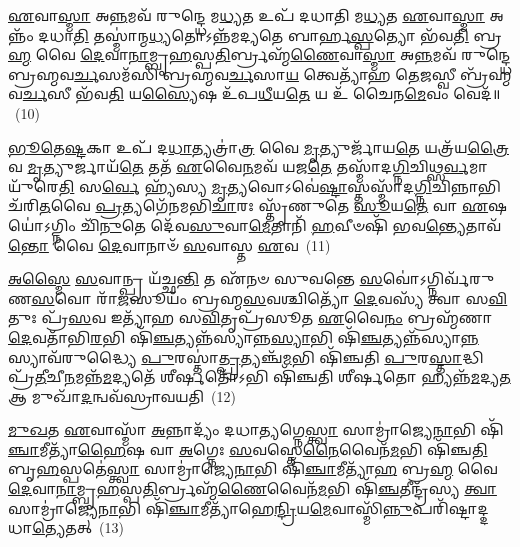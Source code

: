 \-\ul{𑌏}\-𑌵𑌾\-\ul{𑌸𑍍𑌮𑌾} 𑌅\-\ul{𑌨𑍍𑌨}\-𑌮𑌵᳴ 𑌰𑍁𑌨𑍍𑌦𑍍𑌧𑍇 𑌮\-\ul{𑌧𑍍𑌯}\-𑌤 𑌉𑌪᳴ 𑌦𑌧𑌾𑌤𑌿 𑌮\-\ul{𑌧𑍍𑌯}\-𑌤 \ul{𑌏}\-𑌵𑌾\-\ul{𑌸𑍍𑌮𑌾} 𑌅𑌨𑍍𑌨𑌂᳴ 𑌦𑌧𑌾\-\ul{𑌤𑌿} 𑌤𑌸𑍍𑌮𑌾॑𑌨𑍍𑌮\-\ul{𑌧𑍍𑌯}\-𑌤𑍋\-𑌽𑌨𑍍𑌨᳴𑌮𑌦𑍍𑌯𑌤𑍇 𑌬𑌾𑌰𑍍\mbox{}𑌹\-\ul{𑌸𑍍𑌪}\-𑌤𑍍𑌯𑍋 𑌭᳴𑌵\-\ul{𑌤𑌿} 𑌬𑍍𑌰\-\ul{𑌹𑍍𑌮} 𑌵𑍈 \ul{𑌦𑍇}\-𑌵𑌾\-\ul{𑌨𑌾}\-𑌮𑍍𑌬𑍃\-\ul{𑌹}\-𑌸𑍍𑌪\-\ul{𑌤𑌿}\-𑌰𑍍𑌬𑍍𑌰𑌹𑍍𑌮᳴\-\ul{𑌣𑍈}\-𑌵𑌾\-\ul{𑌸𑍍𑌮𑌾} 𑌅\-\ul{𑌨𑍍𑌨}\-𑌮𑌵᳴ 𑌰𑍁𑌨𑍍𑌦𑍍𑌧𑍇 𑌬𑍍𑌰𑌹𑍍𑌮𑌵\-\ul{𑌰𑍍𑌚}\-𑌸𑌮᳴𑌸𑌿 𑌬𑍍𑌰𑌹𑍍𑌮𑌵\-\ul{𑌰𑍍𑌚}\-𑌸𑌾\-\ul{𑌯} 𑌤𑍍𑌵𑍇𑌤𑍍𑌯𑌾᳴𑌹 𑌤𑍇\-\ul{𑌜}\-𑌸𑍍𑌵𑍀 𑌬𑍍𑌰᳴𑌹𑍍𑌮𑌵\-\ul{𑌰𑍍𑌚}\-𑌸𑍀 𑌭᳴𑌵\-\ul{𑌤𑌿} 𑌯\-\ul{𑌸𑍍𑌯𑍈}\-𑌷 𑌉᳴𑌪\-\ul{𑌧𑍀}\-𑌯\-\ul{𑌤𑍇} 𑌯 𑌉᳴ 𑌚𑍈𑌨\-\ul{𑌮𑍇}\-𑌵𑌂 𑌵𑍇𑌦᳴॥~(10)

{\anuvakamend[{\-\ul{𑌅}\-𑌮𑍃𑌤᳴𑌮𑌸𑍍𑌮𑍈 𑌜𑌾𑌯\-\ul{𑌤𑍇} 𑌯\-\ul{𑌸𑍍𑌯𑍈}\-𑌤𑌾 𑌉᳴𑌪\-\ul{𑌧𑍀}\-𑌯\-\ul{𑌨𑍍𑌤𑍇} 𑌯 𑌉᳴ \ul{𑌪}\-𑌰𑍍𑌜𑌨𑍍𑌯᳴ 𑌉\-\ul{𑌪}\-𑌦𑌧𑌾᳴𑌤𑌿 \ul{𑌸𑌾}\-𑌕𑍍𑌷𑌾\-\ul{𑌥𑍍𑌸}\-𑌪𑍍𑌤𑌚᳴𑌤𑍍𑌵𑌾𑌰𑌿𑍞𑌶𑌚𑍍𑌚}]}%

\-\ul{𑌭𑍂}\-\-\ul{𑌤𑍇}\-\-\ul{𑌷𑍍𑌟}\-𑌕𑌾 𑌉𑌪᳴ 𑌦\-\ul{𑌧𑌾}\-𑌤𑍍𑌯𑌤𑍍𑌰𑌾॑\-\ul{𑌤𑍍𑌰} 𑌵𑍈 \ul{𑌮𑍃}\-𑌤𑍍𑌯𑍁𑌰𑍍𑌜𑌾᳴𑌯\-\ul{𑌤𑍇} 𑌯𑌤𑍍𑌰᳴𑌯\-\ul{𑌤𑍍𑌰𑍈}\-𑌵 \ul{𑌮𑍃}\-𑌤𑍍𑌯𑍁𑌰𑍍𑌜𑌾𑌯᳴\-\ul{𑌤𑍇} 𑌤𑌤᳴ \ul{𑌏}\-𑌵𑍈\-\ul{𑌨}\-𑌮𑌵᳴ 𑌯𑌜\-\ul{𑌤𑍇} 𑌤𑌸𑍍𑌮𑌾᳴𑌦\-\ul{𑌗𑍍𑌨𑌿}\-𑌚𑌿𑌥𑍍𑌸\-\ul{𑌰𑍍𑌵}\-𑌮𑌾𑌯𑍁᳴𑌰𑍇\-\ul{𑌤𑌿} 𑌸\-\ul{𑌰𑍍𑌵𑍇} 𑌹𑍍𑌯᳴𑌸𑍍𑌯 \ul{𑌮𑍃}\-𑌤𑍍𑌯𑌵𑍋\-𑌽𑌵𑍇॑\-\ul{𑌷𑍍𑌟𑌾}\-𑌸𑍍𑌤𑌸𑍍𑌮𑌾᳴𑌦\-\ul{𑌗𑍍𑌨𑌿}\-𑌚𑌿𑌨𑍍𑌨𑌾𑌭𑌿𑌚᳴𑌰𑌿\-\ul{𑌤}\-𑌵𑍈 \ul{𑌪𑍍𑌰}\-𑌤𑍍𑌯𑌗𑍇᳴𑌨𑌮𑌭𑌿\-\ul{𑌚𑌾}\-𑌰𑌃 𑌸𑍍𑌤𑍃᳴𑌣𑍁𑌤𑍇 \ul{𑌸𑍂}\-𑌯\-\ul{𑌤𑍇} 𑌵𑌾 \ul{𑌏}\-𑌷 𑌯𑍋॑\-𑌽𑌗𑍍𑌨𑌿𑌂 𑌚𑌿᳴\-\ul{𑌨𑍁}\-𑌤𑍇 𑌦𑍇᳴𑌵\-\ul{𑌸𑍁}\-𑌵𑌾\-\ul{𑌮𑍇}\-𑌤𑌾𑌨𑌿᳴ \ul{𑌹}\-𑌵𑍀𑍞𑌷𑌿᳴ 𑌭𑌵\-\ul{𑌨𑍍𑌤𑍍𑌯𑍇}\-𑌤𑌾𑌵᳴\-\ul{𑌨𑍍𑌤𑍋} 𑌵𑍈 \ul{𑌦𑍇}\-𑌵𑌾𑌨𑌾𑍞᳴ \ul{𑌸}\-𑌵𑌾𑌸𑍍𑌤 \ul{𑌏}\-𑌵~(11)

\-\ul{𑌅}\-\-\ul{𑌸𑍍𑌮𑍈} \ul{𑌸}\-𑌵𑌾𑌨𑍍𑌪𑍍𑌰 𑌯᳴𑌚𑍍𑌛\-\ul{𑌨𑍍𑌤𑌿} 𑌤 𑌏᳴𑌨𑍞 𑌸𑍁𑌵𑌨𑍍𑌤𑍇 \ul{𑌸}\-𑌵𑍋॑\-𑌽𑌗𑍍𑌨𑌿𑌰𑍍𑌵᳴𑌰𑍁𑌣\-\ul{𑌸}\-𑌵𑍋 𑌰𑌾᳴\-\ul{𑌜}\-𑌸𑍂𑌯𑌂᳴ 𑌬𑍍𑌰𑌹𑍍𑌮\-\ul{𑌸}\-𑌵𑌶𑍍𑌚𑌿𑌤𑍍𑌯𑍋᳴ \ul{𑌦𑍇}\-𑌵𑌸𑍍𑌯᳴ 𑌤𑍍𑌵𑌾 𑌸\-\ul{𑌵𑌿}\-𑌤𑍁𑌃 𑌪𑍍𑌰᳴\-\ul{𑌸}\-𑌵 𑌇𑌤𑍍𑌯𑌾᳴𑌹 𑌸\-\ul{𑌵𑌿}\-𑌤𑍃𑌪𑍍𑌰᳴𑌸𑍂𑌤 \ul{𑌏}\-𑌵𑍈\-\ul{𑌨𑌂} 𑌬𑍍𑌰𑌹𑍍𑌮᳴𑌣𑌾 \ul{𑌦𑍇}\-𑌵𑌤𑌾᳴𑌭𑌿\-\ul{𑌰}\-𑌭𑌿 𑌷𑌿᳴\-\ul{𑌞𑍍𑌚}\-𑌤𑍍𑌯𑌨𑍍𑌨᳴𑌸𑍍𑌯𑌾𑌨𑍍𑌨\-\ul{𑌸𑍍𑌯𑌾}\-𑌭𑌿 𑌷𑌿᳴\-\ul{𑌞𑍍𑌚}\-𑌤𑍍𑌯𑌨𑍍𑌨᳴𑌸𑍍𑌯𑌾\-\ul{𑌨𑍍𑌨}\-𑌸𑍍𑌯𑌾𑌵᳴𑌰𑍁𑌦𑍍𑌧𑍍𑌯𑍈 \ul{𑌪𑍁}\-𑌰𑌸𑍍𑌤𑌾॑\-\ul{𑌤𑍍𑌪𑍍𑌰}\-𑌤𑍍𑌯𑌞𑍍𑌚᳴\-\ul{𑌮}\-𑌭𑌿 𑌷𑌿᳴𑌞𑍍𑌚𑌤𑌿 \ul{𑌪𑍁}\-𑌰\-\ul{𑌸𑍍𑌤𑌾}\-𑌦𑍍𑌧𑌿 𑌪𑍍𑌰᳴\-\ul{𑌤𑍀}\-𑌚𑍀\-\ul{𑌨}\-𑌮𑌨𑍍𑌨᳴\-\ul{𑌮}\-𑌦𑍍𑌯𑌤𑍇᳴ 𑌶𑍀𑌰𑍍\mbox{}\-\ul{𑌷}\-𑌤𑍋᳴\-𑌽𑌭𑌿 𑌷𑌿᳴𑌞𑍍𑌚𑌤𑌿 𑌶𑍀𑌰𑍍\mbox{}\-\ul{𑌷}\-𑌤𑍋 𑌹𑍍𑌯𑌨𑍍𑌨᳴\-\ul{𑌮}\-𑌦𑍍𑌯\-\ul{𑌤} 𑌆 𑌮𑍁𑌖𑌾᳴\-\ul{𑌦}\-𑌨𑍍𑌵𑌵᳴𑌸𑍍𑌰𑌾𑌵𑌯𑌤𑌿~(12)

\-\ul{𑌮𑍁}\-\-\ul{𑌖}\-𑌤 \ul{𑌏}\-𑌵𑌾𑌸𑍍𑌮𑌾᳴ \ul{𑌅}\-𑌨𑍍𑌨𑌾𑌦𑍍𑌯𑌂᳴ 𑌦𑌧𑌾\-\ul{𑌤𑍍𑌯}\-𑌗𑍍𑌨𑍇\-\ul{𑌸𑍍𑌤𑍍𑌵𑌾} 𑌸𑌾𑌮𑍍𑌰𑌾॑𑌜𑍍𑌯𑍇\-\ul{𑌨𑌾}\-𑌭𑌿 𑌷𑌿᳴\-\ul{𑌞𑍍𑌚𑌾}\-𑌮𑍀𑌤𑍍𑌯𑌾᳴\-\ul{𑌹𑍈}\-𑌷 𑌵𑌾 \ul{𑌅}\-𑌗𑍍𑌨𑍇𑌃 \ul{𑌸}\-𑌵𑌸𑍍𑌤𑍇\-\ul{𑌨𑍈}\-𑌵𑍈𑌨᳴\-\ul{𑌮}\-𑌭𑌿 𑌷𑌿᳴𑌞𑍍𑌚\-\ul{𑌤𑌿} 𑌬𑍃\-\ul{𑌹}\-𑌸𑍍𑌪𑌤𑍇॑\-\ul{𑌸𑍍𑌤𑍍𑌵𑌾} 𑌸𑌾𑌮𑍍𑌰𑌾॑𑌜𑍍𑌯𑍇\-\ul{𑌨𑌾}\-𑌭𑌿 𑌷𑌿᳴\-\ul{𑌞𑍍𑌚𑌾}\-𑌮𑍀𑌤𑍍𑌯𑌾᳴\-\ul{𑌹} 𑌬𑍍𑌰\-\ul{𑌹𑍍𑌮} 𑌵𑍈 \ul{𑌦𑍇}\-𑌵𑌾\-\ul{𑌨𑌾}\-𑌮𑍍𑌬𑍃\-\ul{𑌹}\-𑌸𑍍𑌪\-\ul{𑌤𑌿}\-𑌰𑍍𑌬𑍍𑌰𑌹𑍍𑌮᳴\-\ul{𑌣𑍈}\-𑌵𑍈𑌨᳴\-\ul{𑌮}\-𑌭𑌿 𑌷𑌿᳴\-\ul{𑌞𑍍𑌚}\-𑌤𑍀𑌨𑍍𑌦𑍍𑌰᳴𑌸𑍍𑌯 \ul{𑌤𑍍𑌵𑌾} 𑌸𑌾𑌮𑍍𑌰𑌾॑𑌜𑍍𑌯𑍇\-\ul{𑌨𑌾}\-𑌭𑌿 𑌷𑌿᳴\-\ul{𑌞𑍍𑌚𑌾}\-𑌮𑍀𑌤𑍍𑌯𑌾᳴𑌹𑍇\-\ul{𑌨𑍍𑌦𑍍𑌰𑌿}\-𑌯\-\ul{𑌮𑍇}\-𑌵𑌾𑌸𑍍𑌮𑌿᳴\-\ul{𑌨𑍍𑌨𑍁}\-𑌪𑌰𑌿᳴𑌷𑍍𑌟𑌾𑌦𑍍𑌦𑌧𑌾\-\ul{𑌤𑍍𑌯𑍇}\-𑌤𑌤𑍍~(13)

